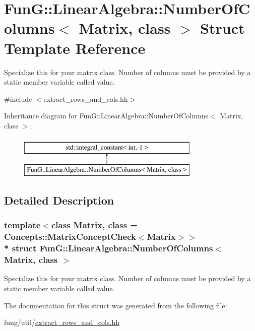 \hypertarget{structFunG_1_1LinearAlgebra_1_1NumberOfColumns}{}\section{FunG\+:\+:Linear\+Algebra\+:\+:Number\+Of\+Columns$<$ Matrix, class $>$ Struct Template Reference}
\label{structFunG_1_1LinearAlgebra_1_1NumberOfColumns}


Specialize this for your matrix class. Number of columns must be provided by a static member variable called value.  




{\ttfamily \#include $<$extract\+\_\+rows\+\_\+and\+\_\+cols.\+hh$>$}

Inheritance diagram for FunG\+:\+:Linear\+Algebra\+:\+:Number\+Of\+Columns$<$ Matrix, class $>$\+:\begin{figure}[H]
\begin{center}
\leavevmode
\includegraphics[height=2.000000cm]{structFunG_1_1LinearAlgebra_1_1NumberOfColumns}
\end{center}
\end{figure}


\subsection{Detailed Description}
\subsubsection*{template$<$class Matrix, class = Concepts\+::\+Matrix\+Concept\+Check$<$\+Matrix$>$$>$\\*
struct Fun\+G\+::\+Linear\+Algebra\+::\+Number\+Of\+Columns$<$ Matrix, class $>$}

Specialize this for your matrix class. Number of columns must be provided by a static member variable called value. 

The documentation for this struct was generated from the following file\+:\begin{DoxyCompactItemize}
\item 
fung/util/\hyperlink{extract__rows__and__cols_8hh}{extract\+\_\+rows\+\_\+and\+\_\+cols.\+hh}\end{DoxyCompactItemize}
